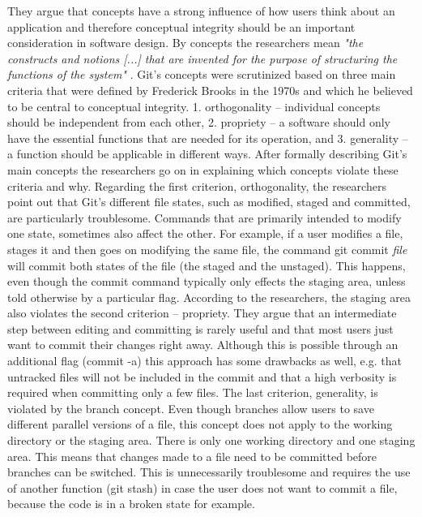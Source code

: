 They argue that concepts have a strong influence of how users think about an application and therefore conceptual integrity should be an important consideration in software design. By concepts the researchers mean \emph{"the constructs and notions [...] that are invented for the purpose of structuring the functions of the system"} \cite[p.~38]{perez_de_rosso_whats_2013}. Git's concepts were scrutinized based on three main criteria that were defined by Frederick Brooks in the 1970s \cite{brooks_mythical_1995} and which he believed to be central to conceptual integrity. 1. orthogonality – individual concepts should be independent from each other, 2. propriety – a software should only have the essential functions that are needed for its operation, and 3. generality – a function should be applicable in different ways. After formally describing Git's main concepts the researchers go on in explaining which concepts violate these criteria and why. Regarding the first criterion, orthogonality, the researchers point out that Git's different file states, such as modified, staged and committed, are particularly troublesome. Commands that are primarily intended to modify one state, sometimes also affect the other. For example, if a user modifies a file, stages it and then goes on modifying the same file, the command git commit \textit{file} will commit both states of the file (the staged and the unstaged). This happens, even though the commit command typically only effects the staging area, unless told otherwise by a particular flag.
According to the researchers, the staging area also violates the second criterion – propriety. They argue that an intermediate step between editing and committing is rarely useful and that most users just want to commit their changes right away. Although this is possible through an additional flag (commit -a) this approach has some drawbacks as well, e.g. that untracked files will not be included in the commit and that a high verbosity is required when committing only a few files.
The last criterion, generality, is violated by the branch concept. Even though branches allow users to save different parallel versions of a file, this concept does not apply to the working directory or the staging area. There is only one working directory and one staging area. This means that changes made to a file need to be committed before branches can be switched. This is unnecessarily troublesome and requires the use of another function (git stash) in case the user does not want to commit a file, because the code is in a broken state for example.

